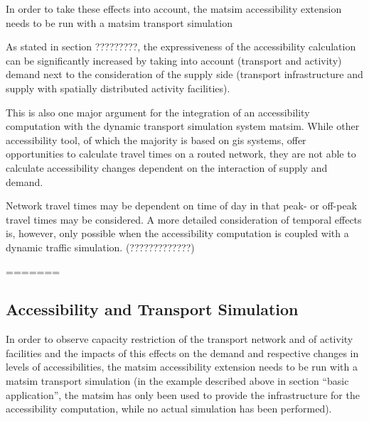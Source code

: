 In order to take these effects into account, the \gls{matsim} accessibility extension 
needs to be run with a \gls{matsim} transport simulation


As stated in section ?????????, the expressiveness of the accessibility calculation can be significantly increased 
by taking into account (transport and activity) demand next to the consideration of the supply side (transport 
infrastructure and supply with spatially distributed activity facilities). 

This is also one major argument for the 
integration of an accessibility computation with the dynamic transport simulation system \gls{matsim}. While other 
accessibility tool, of which the majority is based on \gls{gis} systems, offer opportunities to calculate travel times on 
a routed network, they are not able to calculate accessibility changes dependent on the interaction of supply and 
demand. 

Network travel times may be dependent on time of day in that \eg peak- or off-peak travel times may be 
considered. A more detailed consideration of temporal effects is, however, only possible when the accessibility 
computation is coupled with a dynamic traffic simulation. (?????????????)


=======
\subsection{Accessibility and Transport Simulation}
In order to observe capacity restriction of the transport network and of activity facilities and the impacts of 
this effects on the demand and respective changes in levels of accessibilities, the \gls{matsim} accessibility 
extension needs to be run with a \gls{matsim} transport simulation (in the example described above in section ``basic 
application'', the \gls{matsim} has only been used to provide the infrastructure for the accessibility computation, 
while no actual simulation has been performed).

